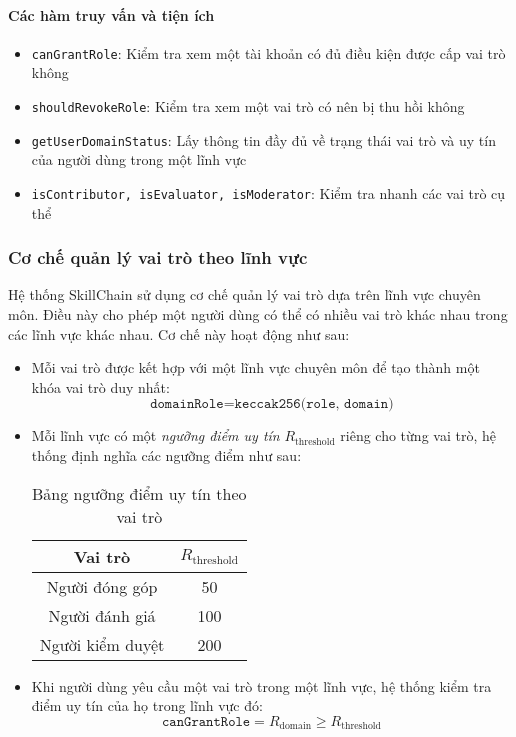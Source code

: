 \paragraph{Các hàm truy vấn và tiện ích}

\begin{itemize}
  \item \texttt{canGrantRole}: Kiểm tra xem một tài khoản có đủ điều kiện được cấp vai trò không
  \item \texttt{shouldRevokeRole}: Kiểm tra xem một vai trò có nên bị thu hồi không
  \item \texttt{getUserDomainStatus}: Lấy thông tin đầy đủ về trạng thái vai trò và uy tín của người dùng trong một lĩnh vực
  \item \texttt{isContributor, isEvaluator, isModerator}: Kiểm tra nhanh các vai trò cụ thể
\end{itemize}

\subsubsection{Cơ chế quản lý vai trò theo lĩnh vực}

Hệ thống SkillChain sử dụng cơ chế quản lý vai trò dựa trên lĩnh vực chuyên môn. Điều này cho phép một người dùng có thể có nhiều vai trò khác nhau trong các lĩnh vực khác nhau. Cơ chế này hoạt động như sau:

\begin{itemize}
  \item Mỗi vai trò được kết hợp với một lĩnh vực chuyên môn để tạo thành một khóa vai trò duy nhất:
        \[ \texttt{domainRole} = \texttt{keccak256(role, domain)} \]

  \item Mỗi lĩnh vực có một \textit{ngưỡng điểm uy tín} $R_{\text{threshold}}$ riêng cho từng vai trò, hệ thống định nghĩa các ngưỡng điểm như sau:
        \begin{table}[H]
          \centering
          \begin{tabular}{|c|c|}
            \hline
            \textbf{Vai trò} & $R_{\text{threshold}}$ \\ \hline
            Người đóng góp   & 50                     \\ \hline
            Người đánh giá   & 100                    \\ \hline
            Người kiểm duyệt & 200                    \\ \hline
          \end{tabular}
          \caption{Bảng ngưỡng điểm uy tín theo vai trò}
          \label{tab:role-reputation-threshold}
        \end{table}
  \item Khi người dùng yêu cầu một vai trò trong một lĩnh vực, hệ thống kiểm tra điểm uy tín của họ trong lĩnh vực đó:
        \[ \texttt{canGrantRole} = R_{\text{domain}} \geq R_{\text{threshold}} \]
\end{itemize}

